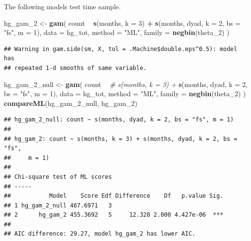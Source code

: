 \documentclass[]{article}
\newenvironment{Shaded}{\begin{snugshade}}{\end{snugshade}}
\newcommand{\CommentTok}[1]{\textcolor[rgb]{0.56,0.35,0.01}{\textit{#1}}}
\newcommand{\DataTypeTok}[1]{\textcolor[rgb]{0.13,0.29,0.53}{#1}}
\newcommand{\DecValTok}[1]{\textcolor[rgb]{0.00,0.00,0.81}{#1}}
\newcommand{\KeywordTok}[1]{\textcolor[rgb]{0.13,0.29,0.53}{\textbf{#1}}}
\newcommand{\NormalTok}[1]{#1}
\newcommand{\OperatorTok}[1]{\textcolor[rgb]{0.81,0.36,0.00}{\textbf{#1}}}
\newcommand{\StringTok}[1]{\textcolor[rgb]{0.31,0.60,0.02}{#1}}
\begin{document}
The following models test time sample.

\begin{Shaded}
\begin{Highlighting}[]
\NormalTok{hg_gam_}\DecValTok{2}\NormalTok{ <-}\StringTok{ }\KeywordTok{gam}\NormalTok{(}
\NormalTok{  count }\OperatorTok{~}
\StringTok{    }\KeywordTok{s}\NormalTok{(months, }\DataTypeTok{k =} \DecValTok{3}\NormalTok{) }\OperatorTok{+}
\StringTok{    }\KeywordTok{s}\NormalTok{(months, dyad, }\DataTypeTok{k =} \DecValTok{2}\NormalTok{, }\DataTypeTok{bs =} \StringTok{"fs"}\NormalTok{, }\DataTypeTok{m =} \DecValTok{1}\NormalTok{),}
  \DataTypeTok{data =}\NormalTok{ hg_tot,}
  \DataTypeTok{method =} \StringTok{"ML"}\NormalTok{,}
  \DataTypeTok{family =} \KeywordTok{negbin}\NormalTok{(theta_}\DecValTok{2}\NormalTok{)}
\NormalTok{)}
\end{Highlighting}
\end{Shaded}

\begin{verbatim}
## Warning in gam.side(sm, X, tol = .Machine$double.eps^0.5): model has
## repeated 1-d smooths of same variable.
\end{verbatim}

\begin{Shaded}
\begin{Highlighting}[]
\NormalTok{hg_gam_}\DecValTok{2}\NormalTok{_null <-}\StringTok{ }\KeywordTok{gam}\NormalTok{(}
\NormalTok{  count }\OperatorTok{~}
\StringTok{    }\CommentTok{# s(months, k = 3) +}
\StringTok{    }\KeywordTok{s}\NormalTok{(months, dyad, }\DataTypeTok{k =} \DecValTok{2}\NormalTok{, }\DataTypeTok{bs =} \StringTok{"fs"}\NormalTok{, }\DataTypeTok{m =} \DecValTok{1}\NormalTok{),}
  \DataTypeTok{data =}\NormalTok{ hg_tot,}
  \DataTypeTok{method =} \StringTok{"ML"}\NormalTok{,}
  \DataTypeTok{family =} \KeywordTok{negbin}\NormalTok{(theta_}\DecValTok{2}\NormalTok{)}
\NormalTok{)}
\KeywordTok{compareML}\NormalTok{(hg_gam_}\DecValTok{2}\NormalTok{_null, hg_gam_}\DecValTok{2}\NormalTok{)}
\end{Highlighting}
\end{Shaded}

\begin{verbatim}
## hg_gam_2_null: count ~ s(months, dyad, k = 2, bs = "fs", m = 1)
## 
## hg_gam_2: count ~ s(months, k = 3) + s(months, dyad, k = 2, bs = "fs", 
##     m = 1)
## 
## Chi-square test of ML scores
## -----
##           Model    Score Edf Difference    Df   p.value Sig.
## 1 hg_gam_2_null 467.6971   3                                
## 2      hg_gam_2 455.3692   5     12.328 2.000 4.427e-06  ***
## 
## AIC difference: 29.27, model hg_gam_2 has lower AIC.
\end{verbatim}
\end{document}
